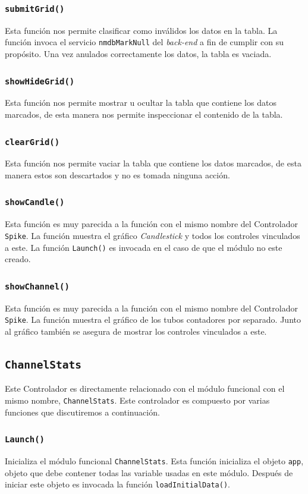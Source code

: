		\subsubsection{\texttt{submitGrid()}}
			Esta función nos permite clasificar como inválidos los datos en la tabla. La función invoca el servicio \texttt{nmdbMarkNull}
			del \emph{back-end} a fin de cumplir con su propósito. Una vez anulados correctamente los datos, la tabla es vaciada.
		\subsubsection{\texttt{showHideGrid()}}
			Esta función nos permite mostrar u ocultar la tabla que contiene los datos marcados, de esta manera nos permite inspeccionar
			el contenido de la tabla.
		\subsubsection{\texttt{clearGrid()}}
			Esta función nos permite vaciar la tabla que contiene los datos marcados, de esta manera estos son descartados y no es tomada
			ninguna acción.
		\subsubsection{\texttt{showCandle()}}
			Esta función es muy parecida a la función con el mismo nombre del Controlador \texttt{Spike}. La función muestra el gráfico
			\emph{Candlestick} y todos los controles vinculados a este. La función \texttt{Launch()} es invocada en el caso de que el módulo
			no este creado.
		\subsubsection{\texttt{showChannel()}}
			Esta función es muy parecida a la función con el mismo nombre del Controlador \texttt{Spike}. La función muestra el gráfico de
			los tubos contadores por separado. Junto al gráfico también se asegura de mostrar los controles vinculados a este.		
	\subsection{\texttt{ChannelStats}}
		Este Controlador es directamente relacionado con el módulo funcional con el mismo nombre, \texttt{ChannelStats}. Este controlador es
		compuesto por varias funciones que discutiremos a continuación.
		\subsubsection{\texttt{Launch()}}
			Inicializa el módulo funcional \texttt{ChannelStats}. Esta función inicializa el objeto \texttt{app}, objeto que debe contener
			todas las variable usadas en este módulo. Después de iniciar este objeto es invocada la función \texttt{loadInitialData()}.
